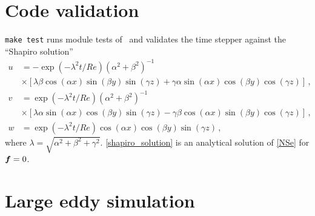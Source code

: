 \documentclass[a4paper, 11pt]{article}
\begin{document}
\section{Code validation}

\texttt{make test} runs module tests of \dnsbox\ and validates the time stepper
against the ``Shapiro solution'' \cite{shapiro1993use}
\begin{align}
    u &= -  \exp (- \lambda^2 t / Re) (\alpha^2 + \beta^2)^{-1} \nonumber \\
      & \times [\lambda \beta \cos(\alpha x) \sin (\beta y) \sin (\gamma z) 
             + \gamma \alpha \sin(\alpha x) \cos (\beta y) \cos (\gamma z)] \,, \nonumber \\
    v &= \exp (- \lambda^2 t / Re) (\alpha^2 + \beta^2)^{-1} \nonumber \\
    & \times [\lambda \alpha \sin(\alpha x) \cos (\beta y) \sin (\gamma z) 
        - \gamma \beta \cos(\alpha x) \sin (\beta y) \cos (\gamma z)] \,, \label{shapiro_solution}\\
    w &= \exp (- \lambda^2 t / Re) \cos(\alpha x) \cos (\beta y) \sin (\gamma z) \,, \nonumber
\end{align}
where $\lambda = \sqrt{\alpha^2 + \beta^2 + \gamma^2}$.  \cref{shapiro_solution} is an 
analytical solution of \cref{NSe} for $\bm{f} = 0$.

\section{Large eddy simulation}
\end{document}
